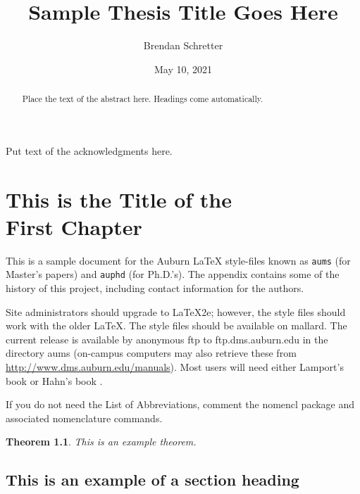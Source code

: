\documentclass[12pt]{report}
\title{Sample Thesis Title Goes Here}
\author{Brendan Schretter}
\date{May 10, 2021} %
\newtheorem{theorem}{Theorem}[chapter]
\begin{document}
\begin{romanpages}      %

\TitlePage 

\begin{abstract} 
Place the text of the abstract here. Headings come automatically.
\end{abstract}

\begin{acknowledgments}
Put text of the acknowledgments here.
\end{acknowledgments}

\tableofcontents
\listoffigures
\listoftables

\printnomenclature[0.5in] %
\end{romanpages}        %


\normalem       %


\chapter{This is the Title of the\\ First Chapter}  %

This is a sample document for the Auburn  \LaTeX{} style-files known
as {\tt aums} (for Master's papers) and {\tt auphd} (for Ph.D.'s).
The appendix contains some of the history of this project, including
contact information for the authors. 

Site administrators should upgrade to \LaTeX2e; however, the style files
should work with the older \LaTeX.  The style files should be available
on mallard.  The current release is available by anonymous ftp to
ftp.dms.auburn.edu in the directory aums (on-campus computers may
also retrieve these from \url{http://www.dms.auburn.edu/manuals}).
Most users will need either Lamport's book \cite{lamport} or Hahn's book
\cite{hahn}.

If you do not need the List of Abbreviations, comment the nomencl package and associated nomenclature commands. 
\begin{theorem} This is an example theorem.
\end{theorem}

\section{This is an example of a section heading}
\end{document}
